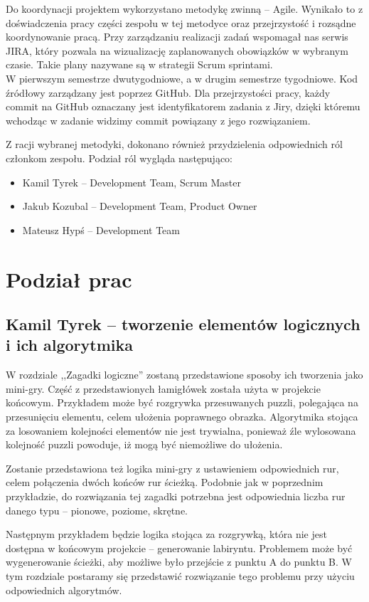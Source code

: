 \documentclass[oneside,polski,logo]{amuthesis}
\begin{document}
Do koordynacji projektem wykorzystano metodykę zwinną – Agile. Wynikało to z doświadczenia pracy części zespołu w tej metodyce oraz przejrzystość i rozsądne koordynowanie pracą. Przy zarządzaniu realizacji zadań wspomagał nas serwis JIRA, który pozwala na wizualizację zaplanowanych obowiązków w wybranym czasie. Takie plany nazywane są w strategii Scrum sprintami.\\ W pierwszym semestrze dwutygodniowe, a w drugim semestrze tygodniowe. Kod źródłowy zarządzany jest poprzez GitHub. Dla przejrzystości pracy, każdy commit na GitHub oznaczany jest identyfikatorem zadania z Jiry, dzięki któremu wchodząc w zadanie widzimy commit powiązany z jego rozwiązaniem. 

Z racji wybranej metodyki, dokonano również przydzielenia odpowiednich ról członkom zespołu. Podział ról wygląda następująco:

\begin{itemize}
	\item Kamil Tyrek –  Development Team, Scrum Master
	\item Jakub Kozubal –  Development Team, Product Owner
	\item Mateusz Hypś –  Development Team
\end{itemize}

\section{Podział prac}
\subsection{Kamil Tyrek – tworzenie elementów logicznych i ich algorytmika}
W rozdziale ,,Zagadki logiczne'' zostaną przedstawione sposoby ich tworzenia jako mini-gry. Część z przedstawionych łamigłówek została użyta w projekcie końcowym. Przykładem może być rozgrywka przesuwanych puzzli, polegająca na przesunięciu elementu, celem ułożenia poprawnego obrazka. Algorytmika stojąca za losowaniem kolejności elementów nie jest trywialna, ponieważ źle wylosowana kolejność puzzli powoduje, iż mogą być niemożliwe do ułożenia.

Zostanie przedstawiona też logika mini-gry z ustawieniem odpowiednich rur, celem połączenia dwóch końców rur ścieżką. Podobnie jak w poprzednim przykładzie, do rozwiązania tej zagadki potrzebna jest odpowiednia liczba rur danego typu – pionowe, poziome, skrętne. 

Następnym przykładem będzie logika stojąca za rozgrywką, która nie jest dostępna w końcowym projekcie – generowanie labiryntu. Problemem może być wygenerowanie ścieżki, aby możliwe było przejście z punktu A do punktu B. W tym rozdziale postaramy się przedstawić rozwiązanie tego problemu przy użyciu odpowiednich algorytmów.
\end{document}
